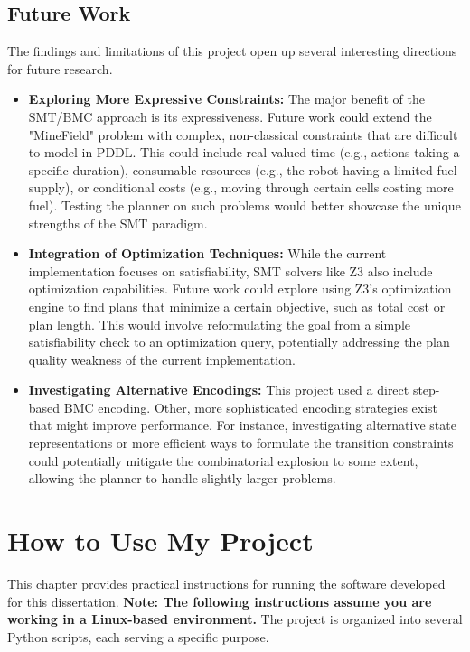 \documentclass[12pt, a4paper, oneside]{report} %
\begin{document}
\section{Future Work}
The findings and limitations of this project open up several interesting directions for future research.
\begin{itemize}
    \item \textbf{Exploring More Expressive Constraints:} The major benefit of the SMT/BMC approach is its expressiveness. Future work could extend the "MineField" problem with complex, non-classical constraints that are difficult to model in PDDL. This could include real-valued time (e.g., actions taking a specific duration), consumable resources (e.g., the robot having a limited fuel supply), or conditional costs (e.g., moving through certain cells costing more fuel). Testing the planner on such problems would better showcase the unique strengths of the SMT paradigm.
    \item \textbf{Integration of Optimization Techniques:} While the current implementation focuses on satisfiability, SMT solvers like Z3 also include optimization capabilities. Future work could explore using Z3's optimization engine to find plans that minimize a certain objective, such as total cost or plan length. This would involve reformulating the goal from a simple satisfiability check to an optimization query, potentially addressing the plan quality weakness of the current implementation.
    \item \textbf{Investigating Alternative Encodings:} This project used a direct step-based BMC encoding. Other, more sophisticated encoding strategies exist that might improve performance. For instance, investigating alternative state representations or more efficient ways to formulate the transition constraints could potentially mitigate the combinatorial explosion to some extent, allowing the planner to handle slightly larger problems.
\end{itemize}


\chapter{How to Use My Project}
\label{chap:manual}

This chapter provides practical instructions for running the software developed for this dissertation. \textbf{Note: The following instructions assume you are working in a Linux-based environment.} The project is organized into several Python scripts, each serving a specific purpose.
\end{document}
